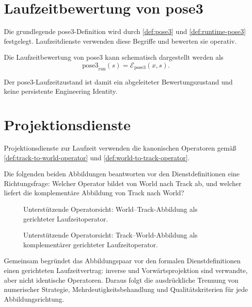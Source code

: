 \section{Laufzeitbewertung von pose3}

Die grundlegende pose3-Definition wird durch \cref{def:pose3} und
\cref{def:runtime-pose3} festgelegt. Laufzeitdienste verwenden diese
Begriffe und bewerten sie operativ.

\begin{definition}
\label{def:runtime-pose3-evaluation}
Die Laufzeitbewertung von pose3 kann schematisch dargestellt werden als
\[
\mathrm{pose3}_{\mathrm{run}}(s)
=
\mathcal E_{\mathrm{pose3}}(x,s).
\]
\end{definition}

Der pose3-Laufzeitzustand ist damit ein abgeleiteter Bewertungszustand und
keine persistente Engineering Identity.

\section{Projektionsdienste}

Projektionsdienste zur Laufzeit verwenden die kanonischen Operatoren gemäß
\cref{def:track-to-world-operator} und \cref{def:world-to-track-operator}.

Die folgenden beiden Abbildungen beantworten vor den Dienstdefinitionen eine
Richtungsfrage: Welcher Operator bildet von World nach Track ab, und welcher
liefert die komplementäre Abbildung von Track nach World?

\begin{figure}[ht]
\centering

\caption{Unterstützende Operatorsicht: World--Track-Abbildung als gerichteter Laufzeitoperator.}
\label{fig:support-world-to-track-operator}
\end{figure}

\begin{figure}[ht]
\centering

\caption{Unterstützende Operatorsicht: Track--World-Abbildung als komplementärer gerichteter Laufzeitoperator.}
\label{fig:support-track-to-world-operator}
\end{figure}

Gemeinsam begründet das Abbildungspaar vor den formalen Dienstdefinitionen
einen gerichteten Laufzeitvertrag: inverse und Vorwärtsprojektion sind
verwandte, aber nicht identische Operatoren. Daraus folgt die ausdrückliche
Trennung von numerischer Strategie, Mehrdeutigkeitsbehandlung und
Qualitätskriterien für jede Abbildungsrichtung.

